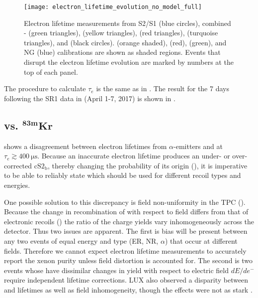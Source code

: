 \begin{figure}
\centering
\texttt{[image: electron\_lifetime\_evolution\_no\_model\_full]}
\caption[Electron lifetime measurements over the lifetime of XENON1T.]{Electron lifetime measurements from S2/S1 (blue circles), combined
- (green triangles), 
(yellow triangles),  (red triangles),  (turquoise triangles), and
\metakr (black circles).  \metakr (orange shaded),  (red), \ambe (green), and NG (blue) calibrations
are shown as shaded regions.  Events that disrupt the electron lifetime evolution are marked by numbers at the top of each panel.}
\label{fig:electron_lifetimes_evolution_no_model}
\end{figure}

The procedure to calculate $\tau_e$ is the same as in .  The result for the
7 days following the SR1 \ambe data in  (April 1-7, 2017)
is shown in .



\subsection[\ce{^{222}Rn} vs. $\mathrm{^{83m}Kr}$][\ce{^{222}Rn} vs. $\mathrm{^{83m}Kr}$]{ vs. $\mathbf{^{83m}Kr}$}
\label{subsec:electron_lifetimes_rn222_vs_kr83m}
 shows a disagreement between electron lifetimes from $\alpha$-emitters and \metakr
at $\tau_e \gtrsim 400\ \mathrm{\mu s}$.  Because an inaccurate electron lifetime produces an under- or over-corrected
$\mathrm{cS2_b}$, thereby changing the probability of its origin (), it is imperative to be able to
reliably state which should be used for different recoil types and energies.

One possible solution to this discrepancy is field non-uniformity in the TPC ().  Because the change in
recombination
of \alphadecays with respect to field differs from that of electronic recoils () the ratio
of the charge yields vary
inhomogeneously across the detector.  Thus two issues are apparent.  The first is bias will be present between any two events of equal
energy and type (ER, NR, $\alpha$) that occur at different fields.  Therefore we cannot expect electron lifetime
measurements to accurately
report the xenon purity unless field distortion is accounted for.  The second is two events whose have dissimilar changes in \electron yield
with respect to electric field
$dE/de^-$ require independent lifetime corrections.  LUX also observed a disparity between \metakr and 
lifetimes as well as field inhomogeneity, though the effects were not as stark .

